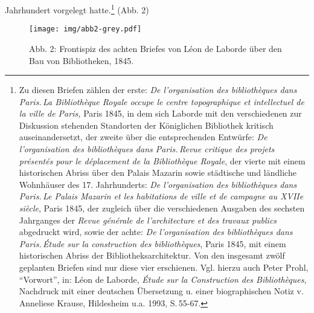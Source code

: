 Jahrhundert vorgelegt hatte.\footnote{Zu diesen Briefen zählen der
  erste: \emph{De l'organisation des bibliothèques dans Paris.\,La
  Bibliothèque Royale occupe le centre topographique et intellectuel de
  la ville de Paris,} Paris 1845, in dem sich Laborde mit den
  verschiedenen zur Diskussion stehenden Standorten der Königlichen
  Bibliothek kritisch auseinandersetzt, der zweite über die
  entsprechenden Entwürfe: \emph{De l'organisation des bibliothèques
  dans Paris.\,Revue critique des projets présentés pour le déplacement
  de la Bibliothèque Royale}, der vierte mit einem historischen Abriss
  über den Palais Mazarin sowie städtische und ländliche Wohnhäuser des
  17. Jahrhunderts: \emph{De l'organisation des bibliothèques dans
  Paris.\,Le Palais Mazarin et les habitations de ville et de campagne au
  XVIIe siècle}, Paris 1845, der zugleich über die verschiedenen
  Ausgaben des sechsten Jahrganges der \emph{Revue générale de
  l'architecture et des travaux publics} abgedruckt wird, sowie der
  achte: \emph{De l'organisation des bibliothèques dans Paris.\,Étude sur
  la construction des bibliothèques}, Paris 1845, mit einem historischen
  Abriss der Bibliotheksarchitektur. Von den insgesamt zwölf geplanten
  Briefen sind nur diese vier erschienen. Vgl. hierzu auch Peter Prohl,
  \enquote{Vorwort}, in: Léon de Laborde, \emph{Étude sur la
  Construction des Bibliothèques}, Nachdruck mit einer deutschen
  Übersetzung u. einer biographischen Notiz v. Anneliese Krause,
  Hildesheim u.a. 1993, S.\,55-67.} (Abb. 2)

\begin{figure}[htbp]
\centering
\texttt{[image: img/abb2-grey.pdf]}
\caption*{Abb. 2: Frontispiz des achten Briefes von Léon de Laborde über
den Bau von Bibliotheken, 1845.}
\end{figure}


